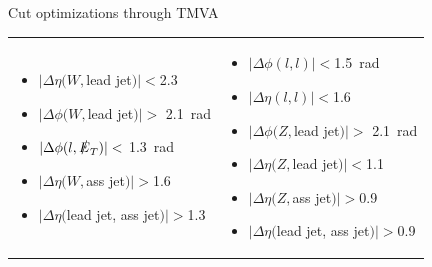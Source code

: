 \documentclass[xcolor=dvipsnames,10pt]{beamer}
\begin{document}
\begin{frame}
\begin{minipage}{.6\textwidth}
Cut optimizations through TMVA~\cite{2007physics...3039H}
{\scriptsize
\begin{tabular}{p{}p{}}
\begin{itemize}
\item $|\Delta \eta(W,$lead jet$)|<$2.3
\item $|\Delta \phi(W,$lead jet$)|>$ 2.1~rad
\item $|\Delta \phi(l,\slashed{E}_T)|<$ 1.3~rad
\item $|\Delta \eta(W,$ass jet$)|>$1.6
\item $|\Delta \eta($lead jet, ass jet$)|>$1.3
\end{itemize} & {\hspace{-2cm}
\begin{itemize}
\item $|\Delta \phi(l,l)|<$1.5~rad
\item $|\Delta \eta(l,l)|<$1.6
\item $|\Delta \phi(Z,$lead jet$)|>$ 2.1~rad
\item $|\Delta \eta(Z,$lead jet$)|<$1.1
\item $|\Delta \eta(Z,$ass jet$)|>$0.9
\item $|\Delta \eta($lead jet, ass jet$)|>$0.9
\end{itemize} }\\
\end{tabular}
}

\end{minipage}

\end{frame}
\end{document}
